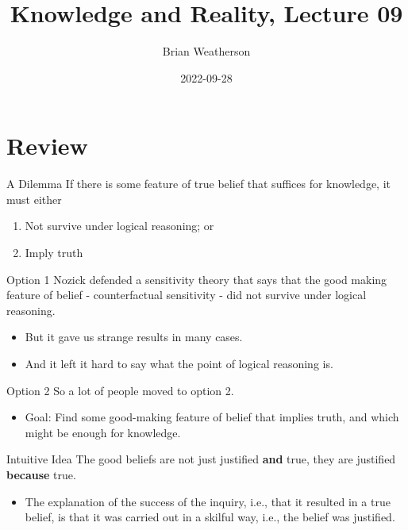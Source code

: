 \documentclass[
  17pt,
  letterpaper,
  ignorenonframetext,
  aspectratio=169,
  handout]{beamer}
\title{Knowledge and Reality, Lecture 09}
\author{Brian Weatherson}
\date{2022-09-28}
\providecommand{\tightlist}{%
  \setlength{\itemsep}{0pt}\setlength{\parskip}{0pt}}\usepackage{longtable,booktabs,array}
\begin{document}
\frame{\titlepage}
\ifdefined\Shaded\renewenvironment{Shaded}{\begin{tcolorbox}[interior hidden, breakable, enhanced, borderline west={3pt}{0pt}{shadecolor}, boxrule=0pt, sharp corners, frame hidden]}{\end{tcolorbox}}\fi

\hypertarget{review}{%
\section{Review}\label{review}}

\begin{frame}{A Dilemma}
\protect\hypertarget{a-dilemma}{}
If there is some feature of true belief that suffices for knowledge, it
must either

\begin{enumerate}[<+->]
\tightlist
\item
  Not survive under logical reasoning; or
\item
  Imply truth
\end{enumerate}
\end{frame}

\begin{frame}{Option 1}
\protect\hypertarget{option-1}{}
Nozick defended a sensitivity theory that says that the good making
feature of belief - counterfactual sensitivity - did not survive under
logical reasoning.

\begin{itemize}[<+->]
\tightlist
\item
  But it gave us strange results in many cases.
\item
  And it left it hard to say what the point of logical reasoning is.
\end{itemize}
\end{frame}

\begin{frame}{Option 2}
\protect\hypertarget{option-2}{}
So a lot of people moved to option 2.

\begin{itemize}[<+->]
\tightlist
\item
  Goal: Find some good-making feature of belief that implies truth, and
  which might be enough for knowledge.
\end{itemize}
\end{frame}

\begin{frame}{Intuitive Idea}
\protect\hypertarget{intuitive-idea}{}
The good beliefs are not just justified \textbf{and} true, they are
justified \textbf{because} true.

\begin{itemize}[<+->]
\tightlist
\item
  The explanation of the success of the inquiry, i.e., that it resulted
  in a true belief, is that it was carried out in a skilful way, i.e.,
  the belief was justified.
\end{itemize}
\end{frame}
\end{document}
